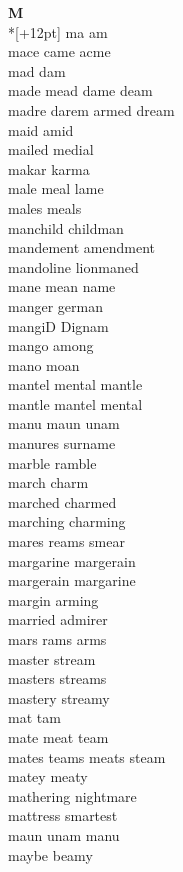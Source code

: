 \vspace{14pt}
\noindent\textbf{\Large M}\\*[+12pt]
ma am\\
mace came acme\\
mad dam\\
made mead dame deam\\
madre darem armed dream\\
maid amid\\
mailed medial\\
makar karma\\
male meal lame\\
males meals\\
manchild childman\\
mandement amendment\\
mandoline lionmaned\\
mane mean name\\
manger german\\
mangiD Dignam\\
mango among\\
mano moan\\
mantel mental mantle\\
mantle mantel mental\\
manu maun unam\\
manures surname\\
marble ramble\\
march charm\\
marched charmed\\
marching charming\\
mares reams smear\\
margarine margerain\\
margerain margarine\\
margin arming\\
married admirer\\
mars rams arms\\
master stream\\
masters streams\\
mastery streamy\\
mat tam\\
mate meat team\\
mates teams meats steam\\
matey meaty\\
mathering nightmare\\
mattress smartest\\
maun unam manu\\
maybe beamy\\
